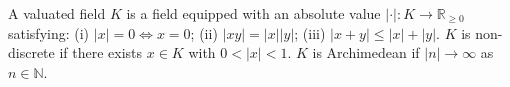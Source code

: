 A valuated field $K$ is a field equipped with an absolute value $|\cdot|: K \to \mathbb{R}_{\geq 0}$ satisfying: (i) $|x| = 0 \iff x = 0$; (ii) $|xy| = |x||y|$; (iii) $|x + y| \leq |x| + |y|$. $K$ is non-discrete if there exists $x \in K$ with $0 < |x| < 1$. $K$ is Archimedean if $|n| \to \infty$ as $n \in \mathbb{N}$.
